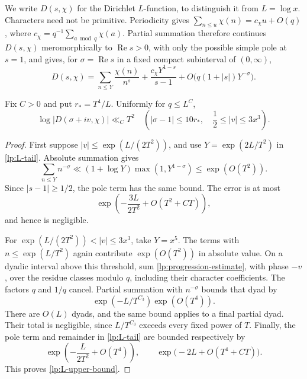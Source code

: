 We write $D(s,\chi)$ for the Dirichlet $L$-function, to distinguish it
from $L=\log x$.  Characters need not be primitive.  Periodicity gives
$\sum_{n\le u}\chi(n)=c_\chi u+O(q)$, where
$c_\chi=q^{-1}\sum_{a\bmod q}\chi(a)$.  Partial summation therefore
continues $D(s,\chi)$ meromorphically to $\operatorname{Re}s>0$, with
only the possible simple pole at $s=1$, and gives, for
$\sigma=\operatorname{Re}s$ in a fixed compact subinterval of $(0,\infty)$,
\begin{equation}\label{lp:L-tail}
 D(s,\chi)=\sum_{n\le Y}\frac{\chi(n)}{n^s}
       +\frac{c_\chi Y^{1-s}}{s-1}
       +O\bigl(q(1+|s|)Y^{-\sigma}\bigr).
\end{equation}

\begin{lemma}[A bound near the line $\operatorname{Re}s=1$]
\label{lp:L-upper}
Fix $C>0$ and put $r_*=T^4/L$.  Uniformly for $q\le L^C$,
\begin{equation}\label{lp:L-upper-bound}
 \log|D(\sigma+iv,\chi)|\ll_C T^2
 \quad\left(|\sigma-1|\le10r_*,\quad
                   \frac12\le|v|\le3x^3\right).
\end{equation}
\end{lemma}

\begin{proof}
First suppose $|v|\le\exp(L/(2T^2))$, and use
$Y=\exp(2L/T^2)$ in \eqref{lp:L-tail}.  Absolute summation gives
\[
 \sum_{n\le Y}n^{-\sigma}
 \ll(1+\log Y)\max(1,Y^{1-\sigma})\le\exp(O(T^2)).
\]
Since $|s-1|\ge1/2$, the pole term has the same bound.  The error is
at most
\[
 \exp\left(-\frac{3L}{2T^2}+O(T^2+CT)\right),
\]
and hence is negligible.

For $\exp(L/(2T^2))<|v|\le3x^3$, take $Y=x^5$.
The terms with $n\le\exp(L/T^2)$ again contribute
$\exp(O(T^2))$ in absolute value.  On a dyadic interval above this
threshold, sum \eqref{lp:progression-estimate}, with phase $-v$, over
the residue classes modulo $q$, including their character coefficients.
The factors $q$ and $1/q$ cancel.  Partial summation with $n^{-\sigma}$
bounds that dyad by
\[
 \exp(-L/T^{C_3})\exp(O(T^4)).
\]
There are $O(L)$ dyads, and the same bound applies to a final partial
dyad.  Their total is negligible, since $L/T^{C_3}$ exceeds every
fixed power of $T$.  Finally, the pole term and remainder in
\eqref{lp:L-tail} are bounded respectively by
\[
 \exp\left(-\frac{L}{2T^2}+O(T^4)\right),\qquad
 \exp\bigl(-2L+O(T^4+CT)\bigr).
\]
This proves \eqref{lp:L-upper-bound}.
\end{proof}

